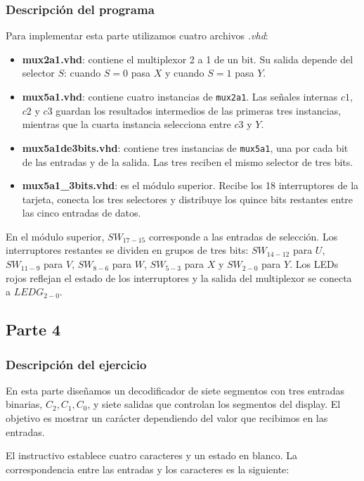 \documentclass[12pt]{report}
\begin{document}
\subsubsection*{Descripción del programa}
Para implementar esta parte utilizamos cuatro archivos \textit{.vhd}:

\begin{itemize}
    \item \textbf{mux2a1.vhd}: contiene el multiplexor 2 a 1 de un bit. Su salida depende del selector $S$: cuando $S=0$ pasa $X$ y cuando $S=1$ pasa $Y$.
    \item \textbf{mux5a1.vhd}: contiene cuatro instancias de \texttt{mux2a1}. Las señales internas $c1$, $c2$ y $c3$ guardan los resultados intermedios de las primeras tres instancias, mientras que la cuarta instancia selecciona entre $c3$ y $Y$.
    \item \textbf{mux5a1de3bits.vhd}: contiene tres instancias de \texttt{mux5a1}, una por cada bit de las entradas y de la salida. Las tres reciben el mismo selector de tres bits.
    \item \textbf{mux5a1\_3bits.vhd}: es el módulo superior. Recibe los 18 interruptores de la tarjeta, conecta los tres selectores y distribuye los quince bits restantes entre las cinco entradas de datos.
\end{itemize}

En el módulo superior, $SW_{17-15}$ corresponde a las entradas de selección. Los interruptores restantes se dividen en grupos de tres bits: $SW_{14-12}$ para $U$, $SW_{11-9}$ para $V$, $SW_{8-6}$ para $W$, $SW_{5-3}$ para $X$ y $SW_{2-0}$ para $Y$. Los LEDs rojos reflejan el estado de los interruptores y la salida del multiplexor se conecta a $LEDG_{2-0}$.

\subsection*{Parte 4}
\subsubsection*{Descripción del ejercicio}
En esta parte diseñamos un decodificador de siete segmentos con tres entradas binarias, $C_2,C_1,C_0$, y siete salidas que controlan los segmentos del display. El objetivo es mostrar un carácter dependiendo del valor que recibimos en las entradas.

El instructivo establece cuatro caracteres y un estado en blanco. La correspondencia entre las entradas y los caracteres es la siguiente:
\end{document}
